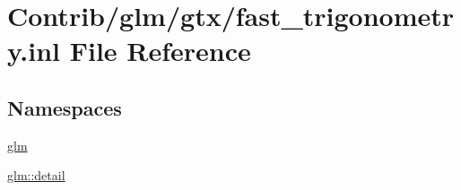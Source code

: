 \hypertarget{fast__trigonometry_8inl}{}\section{Contrib/glm/gtx/fast\+\_\+trigonometry.inl File Reference}
\label{fast__trigonometry_8inl}
\subsection*{Namespaces}
\begin{DoxyCompactItemize}
\item 
 \mbox{\hyperlink{namespaceglm}{glm}}
\item 
 \mbox{\hyperlink{namespaceglm_1_1detail}{glm\+::detail}}
\end{DoxyCompactItemize}
